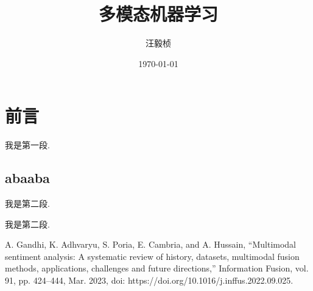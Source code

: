 \documentclass[12pt, a4paper, oneside]{ctexart}
\title{多模态机器学习}
\author{汪毅桢}
\date{\today}
\begin{document}
\maketitle
\newpage
\section{前言}
我是第一段.
\subsection{abaaba}
我是第二段.

我是第二段.\cite{1}
\newpage
\begin{thebibliography}{99}
    A. Gandhi, K. Adhvaryu, S. Poria, E. Cambria, and A. Hussain, “Multimodal sentiment analysis: A systematic review of history, datasets, multimodal fusion methods, applications, challenges and future directions,” Information Fusion, vol. 91, pp. 424–444, Mar. 2023, doi: https://doi.org/10.1016/j.inffus.2022.09.025.
\end{thebibliography}
\end{document}
